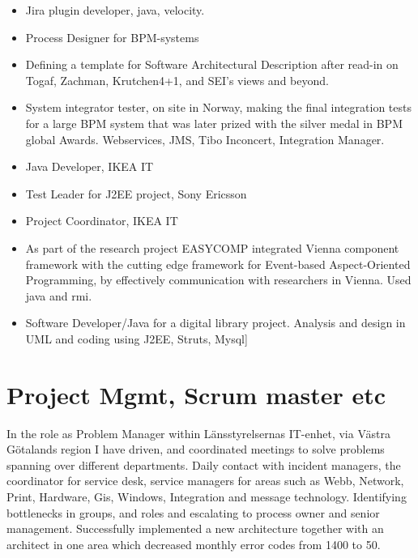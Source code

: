\documentclass[11pt,a4paper,sans]{moderncv}
\begin{document}
\begin{itemize}
    \item Jira plugin developer, java, velocity. 
    \item Process Designer for BPM-systems 
    \item Defining a template for Software Architectural Description after read-in on Togaf, Zachman, Krutchen4+1, and SEI’s views and beyond. 
    \item  System integrator tester, on site in Norway, making the final integration tests for a large BPM system that was later prized with the silver medal in BPM global Awards. Webservices, JMS, Tibo Inconcert, Integration Manager. 
    \item Java Developer, IKEA IT 
    \item Test Leader for J2EE project, Sony Ericsson 
    \item Project Coordinator, IKEA IT 
\end{itemize}

\begin{itemize}
 \item As part of the research project EASYCOMP integrated Vienna component framework with the cutting edge framework for Event-based Aspect-Oriented Programming, by effectively communication with researchers in Vienna. Used java and rmi. 

 \item Software Developer/Java for a digital library project. Analysis and design in UML and coding using J2EE, Struts, Mysql] 
\end{itemize}


\large
\section {Project Mgmt, Scrum master etc}


In the role as Problem Manager within Länsstyrelsernas IT-enhet, via Västra Götalands region I have driven, and coordinated meetings to solve problems spanning over different departments. Daily contact with incident managers, the coordinator for service desk, service managers for areas such as Webb, Network, Print, Hardware, Gis, Windows, Integration and message technology. Identifying bottlenecks in groups, and roles and escalating to process owner and senior management. Successfully implemented a new architecture together with an architect in one area which decreased monthly error codes from 1400 to 50.  
\end{document}
